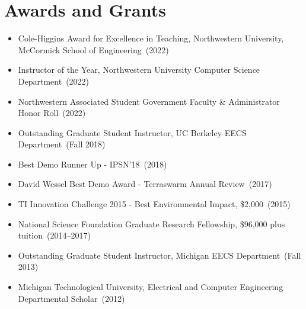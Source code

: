 \documentclass{article}
\begin{document}
\section*{Awards and Grants}
\vspace{-6pt}
\begin{itemize}
  \item[] Cole-Higgins Award for Excellence in Teaching, Northwestern University, McCormick School of Engineering~(2022)
  \item[] Instructor of the Year, Northwestern University Computer Science Department~(2022)
  \item[] Northwestern Associated Student Government Faculty \& Administrator Honor Roll~(2022)
  \item[] Outstanding Graduate Student Instructor, UC Berkeley EECS Department~(Fall 2018)
  \item[] Best Demo Runner Up - IPSN'18~(2018)
  \item[] David Wessel Best Demo Award - Terraswarm Annual Review~(2017)
  \item[] TI Innovation Challenge 2015 - Best Environmental Impact, \$2,000~(2015)
  \item[] National Science Foundation Graduate Research Fellowship, \$96,000 plus tuition~(2014--2017)
  \item[] Outstanding Graduate Student Instructor, Michigan EECS Department~(Fall 2013)
  \item[] Michigan Technological University, Electrical and Computer Engineering Departmental Scholar~(2012)
\end{itemize}
\end{document}
